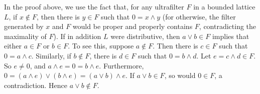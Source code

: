 \documentclass[12pt]{article}
\begin{document}
In the proof above, we use the fact that, for any ultrafilter $F$ in a bounded lattice $L$, if $x\notin F$, then there is $y\in F$ such that $0= x\wedge y$ (for otherwise, the filter generated by $x$ and $F$ would be proper and properly contains $F$, contradicting the maximality of $F$).  If in addition $L$ were distributive, then $a\vee b\in F$ implies that either $a\in F$ or $b\in F$.  To see this, suppose $a\notin F$.  Then there is $c\in F$ such that $0=a\wedge c$.  Similarly, if $b\notin F$, there is $d\in F$ such that $0=b\wedge d$.  Let $e=c\wedge d\in F$.  So $e\ne 0$, and $a\wedge e=0=b\wedge e$.  Furthermore, $0=(a\wedge e)\vee (b\wedge e)=(a\vee b)\wedge e$.  If $a\vee b\in F$, so would $0\in F$, a contradiction.  Hence $a\vee b\notin F$.

\end{document}
